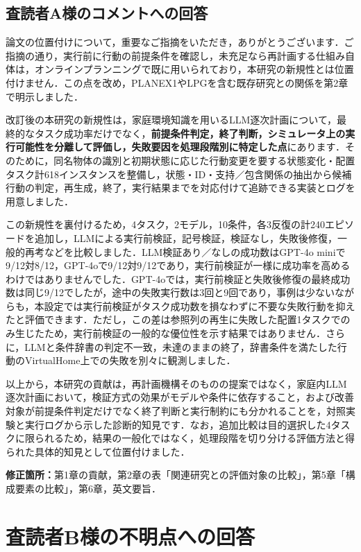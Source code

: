 \documentclass{jsarticle}
\begin{document}
\subsection*{査読者A様のコメントへの回答}
論文の位置付けについて，重要なご指摘をいただき，ありがとうございます．ご指摘の通り，実行前に行動の前提条件を確認し，未充足なら再計画する仕組み自体は，オンラインプランニングで既に用いられており，本研究の新規性とは位置付けません．この点を改め，PLANEX1やLPGを含む既存研究との関係を第2章で明示しました．

改訂後の本研究の新規性は，家庭環境知識を用いるLLM逐次計画について，最終的なタスク成功率だけでなく，\textbf{前提条件判定，終了判断，シミュレータ上の実行可能性を分離して評価し，失敗要因を処理段階別に特定した点}にあります．そのために，同名物体の識別と初期状態に応じた行動変更を要する状態変化・配置タスク計618インスタンスを整備し，状態・ID・支持／包含関係の抽出から候補行動の判定，再生成，終了，実行結果までを対応付けて追跡できる実装とログを用意しました．

この新規性を裏付けるため，4タスク，2モデル，10条件，各3反復の計240エピソードを追加し，LLMによる実行前検証，記号検証，検証なし，失敗後修復，一般的再考などを比較しました．LLM検証あり／なしの成功数はGPT-4o miniで9/12対8/12，GPT-4oで9/12対9/12であり，実行前検証が一様に成功率を高めるわけではありませんでした．GPT-4oでは，実行前検証と失敗後修復の最終成功数は同じ9/12でしたが，途中の失敗実行数は3回と9回であり，事例は少ないながらも，本設定では実行前検証がタスク成功数を損なわずに不要な失敗行動を抑えたと評価できます．ただし，この差は参照列の再生に失敗した配置1タスクでのみ生じたため，実行前検証の一般的な優位性を示す結果ではありません．さらに，LLMと条件辞書の判定不一致，未達のままの終了，辞書条件を満たした行動のVirtualHome上での失敗を別々に観測しました．

以上から，本研究の貢献は，再計画機構そのものの提案ではなく，家庭内LLM逐次計画において，検証方式の効果がモデルや条件に依存すること，および改善対象が前提条件判定だけでなく終了判断と実行制約にも分かれることを，対照実験と実行ログから示した診断的知見です．なお，追加比較は目的選択した4タスクに限られるため，結果の一般化ではなく，処理段階を切り分ける評価方法と得られた具体的知見として位置付けました．

\noindent\textbf{修正箇所：}第1章の貢献，第2章の表「関連研究との評価対象の比較」，第5章「構成要素の比較」，第6章，英文要旨．


\newpage

\section*{査読者B様の不明点への回答}
\end{document}
